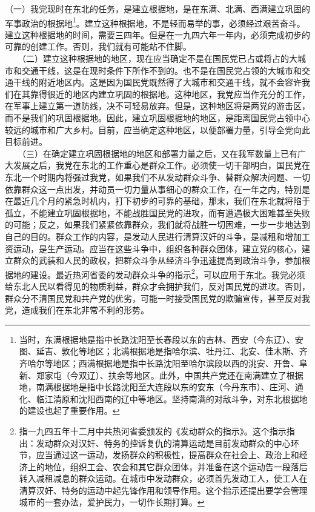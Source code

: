 \documentclass[cn,11pt,chinese]{elegantbook}
\begin{document}
（一）我党现时在东北的任务，是建立根据地，是在东满、北满、西满建立巩固的军事政治的根据地\footnote[1]{ 当时，东满根据地是指中长路沈阳至长春段以东的吉林、西安（今东辽）、安图、延吉、敦化等地区；北满根据地是指哈尔滨、牡丹江、北安、佳木斯、齐齐哈尔等地区；西满根据地是指中长路沈阳至哈尔滨段以西的洮安、开鲁、阜新、郑家屯（今双辽）、扶余等地区。此外，中国共产党还在南满建立了根据地，南满根据地是指中长路沈阳至大连段以东的安东（今丹东市）、庄河、通化、临江清原和沈阳西南的辽中等地区。坚持南满的对敌斗争，对东北根据地的建设也起了重要作用。}。建立这种根据地，不是轻而易举的事，必须经过艰苦奋斗。建立这种根据地的时间，需要三四年。但是在一九四六年一年内，必须完成初步的可靠的创建工作。否则，我们就有可能站不住脚。\\
　　（二）建立这种根据地的地区，现在应当确定不是在国民党已占或将占的大城市和交通干线，这是在现时条件下所作不到的。也不是在国民党占领的大城市和交通干线的附近地区内。这是因为国民党既然得了大城市和交通干线，就不会容许我们在其靠得很近的地区内建立巩固的根据地。这种地区，我党应当作充分的工作，在军事上建立第一道防线，决不可轻易放弃。但是，这种地区将是两党的游击区，而不是我们的巩固根据地。因此，建立巩固根据地的地区，是距离国民党占领中心较远的城市和广大乡村。目前，应当确定这种地区，以便部署力量，引导全党向此目标前进。\\
　　（三）在确定建立巩固根据地的地区和部署力量之后，又在我军数量上已有广大发展之后，我党在东北的工作重心是群众工作。必须使一切干部明白，国民党在东北一个时期内将强过我党，如果我们不从发动群众斗争、替群众解决问题、一切依靠群众这一点出发，并动员一切力量从事细心的群众工作，在一年之内，特别是在最近几个月的紧急时机内，打下初步的可靠的基础，那末，我们在东北就将陷于孤立，不能建立巩固根据地，不能战胜国民党的进攻，而有遭遇极大困难甚至失败的可能；反之，如果我们紧紧依靠群众，我们就将战胜一切困难，一步一步地达到自己的目的。群众工作的内容，是发动人民进行清算汉奸的斗争，是减租和增加工资运动，是生产运动。应当在这些斗争中，组织各种群众团体，建立党的核心，建立群众的武装和人民的政权，把群众斗争从经济斗争迅速提高到政治斗争，参加根据地的建设。最近热河省委的发动群众斗争的指示\footnote[2]{ 指一九四五年十二月中共热河省委颁发的《发动群众的指示》。这个指示指出：发动群众对汉奸、特务的控诉复仇的清算运动是目前发动群众的中心环节，应当通过这一运动，发扬群众的积极性，提高群众在社会上、政治上和经济上的地位，组织工会、农会和其它群众团体，并准备在这个运动告一段落后转入减租减息的群众运动。在城市中发动群众，必须首先发动工人，使工人在清算汉奸、特务的运动中起先锋作用和领导作用。这个指示还提出要学会管理城市的一套办法，爱护民力，一切作长期打算。}，可以应用于东北。我党必须给东北人民以看得见的物质利益，群众才会拥护我们，反对国民党的进攻。否则，群众分不清国民党和共产党的优劣，可能一时接受国民党的欺骗宣传，甚至反对我党，造成我们在东北非常不利的形势。\\
\end{document}
